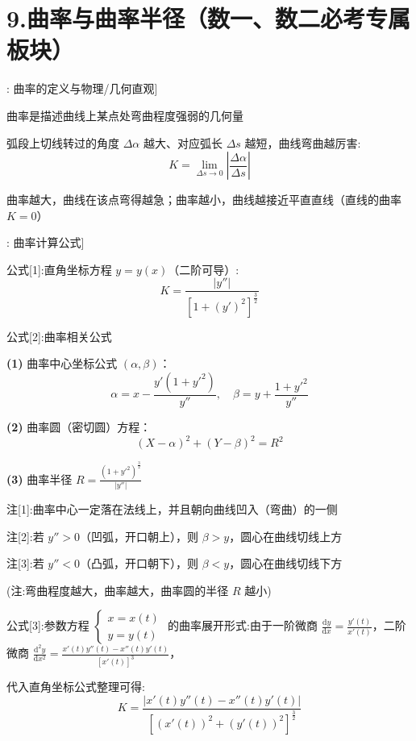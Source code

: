 \documentclass[11pt,a4paper,UTF8]{ctexart}
\begin{document}
\section{9.曲率与曲率半径（数一、数二必考专属板块）}

\begin{thmbox}[原理[1]: 曲率的定义与物理/几何直观]

曲率是描述曲线上某点处弯曲程度强弱的几何量

弧段上切线转过的角度 $\Delta \alpha$ 越大、对应弧长 $\Delta s$ 越短，曲线弯曲越厉害:
\begin{equation*}
K = \lim_{\Delta s \to 0} \left\vert{}\frac{\Delta \alpha}{\Delta s}\right\vert{}
\end{equation*}


曲率越大，曲线在该点弯得越急；曲率越小，曲线越接近平直直线（直线的曲率 $K = 0$）

\end{thmbox}
\begin{thmbox}[原理[2]: 曲率计算公式]

公式[1]:直角坐标方程 $y = y(x)$（二阶可导）:
\begin{equation*}
K = \frac{\vert{}y''\vert{}}{\left[1 + (y')^2\right]^{\frac{3}{2}}}
\end{equation*}


公式[2]:曲率相关公式

\textbf{(1)} 曲率中心坐标公式 $(\alpha, \beta)$：
\begin{equation*}
\alpha = x - \frac{y'(1 + y'^2)}{y''}, \quad \beta = y + \frac{1 + y'^2}{y''}
\end{equation*}


\textbf{(2)} 曲率圆（密切圆）方程：
\begin{equation*}
(X - \alpha)^2 + (Y - \beta)^2 = R^2
\end{equation*}


\textbf{(3)} 曲率半径 $R = \frac{(1 + y'^2)^{\frac{3}{2}}}{\vert{}y''\vert{}}$

注[1]:曲率中心一定落在法线上，并且朝向曲线凹入（弯曲）的一侧

注[2]:若 $y'' > 0$（凹弧，开口朝上），则 $\beta > y$，圆心在曲线切线上方

注[3]:若 $y'' < 0$（凸弧，开口朝下），则 $\beta < y$，圆心在曲线切线下方

(注:弯曲程度越大，曲率越大，曲率圆的半径 $R$ 越小)

公式[3]:参数方程 $\begin{cases} x = x(t) \\ y = y(t) \end{cases}$ 的曲率展开形式:由于一阶微商 $\frac{\mathrm{d}y}{\mathrm{d}x} = \frac{y'(t)}{x'(t)}$，二阶微商 $\frac{\mathrm{d}^2y}{\mathrm{d}x^2} = \frac{x'(t)y''(t) - x''(t)y'(t)}{[x'(t)]^3}$，

	代入直角坐标公式整理可得:
\begin{equation*}
K = \frac{\vert{}x'(t)y''(t) - x''(t)y'(t)\vert{}}{\left[(x'(t))^2 + (y'(t))^2\right]^{\frac{3}{2}}}
\end{equation*}


\end{thmbox}
\end{document}
